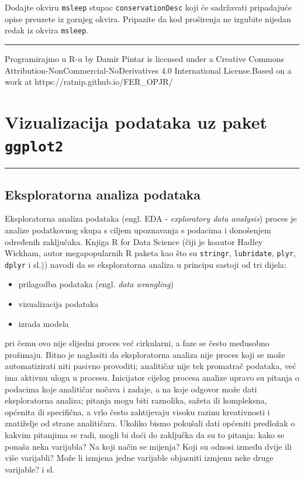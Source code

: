 \documentclass[]{book}
\providecommand{\tightlist}{%
  \setlength{\itemsep}{0pt}\setlength{\parskip}{0pt}}
\theoremstyle{definition}
\theoremstyle{definition}
\theoremstyle{definition}
\theoremstyle{remark}
\begin{document}
Dodajte okviru \texttt{msleep} stupac \texttt{conservationDesc} koji će
sadržavati pripadajuće opise preuzete iz gornjeg okvira. Pripazite da
kod proširenja ne izgubite nijedan redak iz okvira \texttt{msleep}.

\begin{center}\rule{0.5\linewidth}{\linethickness}\end{center}

{Programirajmo u R-u} by Damir Pintar is licensed under a Creative
Commons Attribution-NonCommercial-NoDerivatives 4.0 International
License.Based on a work at https://ratnip.github.io/FER\_OPJR/

\chapter{\texorpdfstring{Vizualizacija podataka uz paket
\texttt{ggplot2}}{Vizualizacija podataka uz paket ggplot2}}\label{ggplot2}

\begin{center}\rule{0.5\linewidth}{\linethickness}\end{center}

\section{Eksploratorna analiza
podataka}\label{eksploratorna-analiza-podataka}

Eksploratorna analiza podataka (engl. EDA - \emph{exploratory data
analysis}) proces je analize podatkovnog skupa s ciljem upoznavanja s
podacima i donošenjem određenih zaključaka. Knjiga R for Data Science
(čiji je koautor Hadley Wickham, autor megapopularnih R paketa kao što
su \texttt{stringr}, \texttt{lubridate}, \texttt{plyr}, \texttt{dplyr} i
sl.)) navodi da se eksploratorna analiza u principu sastoji od tri
dijela:

\begin{itemize}
\tightlist
\item
  prilagodba podataka (engl. \emph{data wrangling})
\item
  vizualizacija podataka
\item
  izrada modela
\end{itemize}

pri čemu ovo nije slijedni proces već cirkularni, a faze se često
međusobno prožimaju. Bitno je naglasiti da eksploratorna analiza nije
proces koji se može automatizirati niti pasivno provoditi; analitičar
nije tek promatrač podataka, već ima aktivnu ulogu u procesu. Inicijator
cijelog procesa analize upravo su pitanja o podacima koje analitičar
uočava i zadaje, a na koje odgovor može dati eksploratorna analiza;
pitanja mogu biti raznolika, sažeta ili kompleksna, općenita ili
specifična, a vrlo često zahtijevaju visoku razinu kreativnosti i
znatiželje od strane analitičara. Ukoliko bismo pokušali dati općeniti
predložak o kakvim pitanjima se radi, mogli bi doći do zaključka da su
to pitanja: kako se ponaša neka varijabla? Na koji način se mijenja?
Koji su odnosi između dvije ili više varijabli? Može li izmjena jedne
varijable objasniti izmjenu neke druge varijable? i sl.
\end{document}
